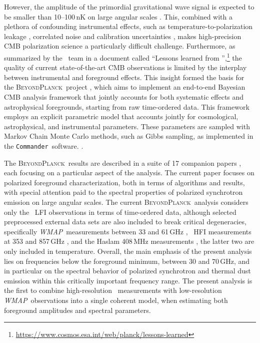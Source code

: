 \documentclass[twocolumn]{aa}
\def\WMAP{\textit{WMAP}}
\def\commander{\texttt{Commander}}
\newcommand{\BP}{\textsc{BeyondPlanck}}
\newcommand{\?}[1]{\textcolor{red}{{\bf [#1]}}}
\begin{document}
However, the amplitude of the primordial gravitational wave signal is expected
to be smaller than 10--100\,nK on large angular scales \citep{tristram:2021}.
This, combined with a plethora of confounding instrumental effects, such as
temperature-to-polarization leakage \citep{bp12}, correlated noise \citep{bp06}
and calibration uncertainties \citep{bp07}, makes high-precision CMB
polarization science a particularly difficult challenge. Furthermore, as
summarized by the \Planck\ team in a document called ``Lessons learned from
\Planck'',\footnote{\href{URL}{https://www.cosmos.esa.int/web/planck/lessons-learned}}
the quality of current state-of-the-art CMB observations is limited by the
interplay between instrumental and foreground effects. This insight formed the
basis for the \BP\ project \citep{bp01}, which aims to implement an end-to-end
Bayesian CMB analysis framework that jointly accounts for both systematic
effects and astrophysical foregrounds, starting from raw time-ordered data. This
framework employs an explicit parametric model that accounts jointly for
cosmological, astrophysical, and instrumental parameters. These parameters are
sampled with Markov Chain Monte Carlo methods, such as Gibbs sampling, as implemented in
the \commander\ software. \citep{eriksen:2004,eriksen2008,bp03}.

The \BP\ results are described in a suite of 17 companion papers \citep[see][and
references therein]{bp01}, each focusing on a particular aspect of the analysis.
The current paper focuses on polarized foreground characterization, both in
terms of algorithms and results, with special attention paid to the spectral
properties of polarized synchrotron emission on large angular scales. The
current \BP\ analysis considers only the \Planck\ LFI observations in terms of
time-ordered data, although selected preprocessed external data sets are also
included to break critical degeneracies, specifically \WMAP\ measurements
between 33 and 61\,GHz \citep{bennett2012}, \Planck\ HFI measurements at 353 and
857\,GHz \citep{planck2016-l01,planck2020-LVII}, and the Haslam 408\,MHz
measurements \citep{haslam1982}, the latter two are only included in
temperature. Overall, the main emphasis of the present analysis lies on
frequencies below the foreground minimum, between 30 and 70\,GHz, and in
particular on the spectral behavior of polarized synchrotron and thermal dust
emission within this critically important frequency range. The present analysis
is the first to combine high-resolution \Planck\ measurements with
low-resolution \WMAP\ observations into a single coherent model, when estimating
both foreground amplitudes and spectral parameters.
\end{document}
